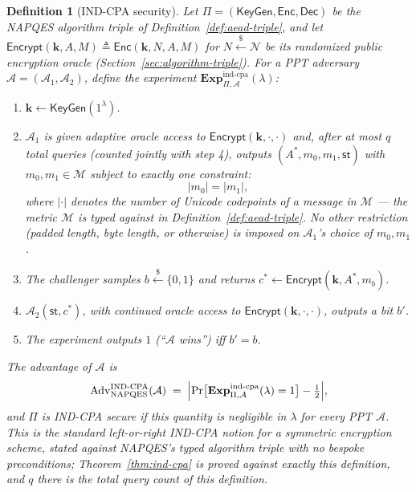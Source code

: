 \documentclass[11pt,a4paper]{article}
\newtheorem{definition}[theorem]{Definition}
\begin{document}
\begin{definition}[IND-CPA security]\label{def:ind-cpa}
Let $\Pi=(\mathsf{KeyGen},\mathsf{Enc},\mathsf{Dec})$ be the NAPQES
algorithm triple of Definition~\ref{def:aead-triple}, and let
$\mathsf{Encrypt}(\mathbf{k},A,M)\triangleq\mathsf{Enc}(\mathbf{k},N,A,M)$
for $N\xleftarrow{\$}\mathcal{N}$ be its randomized public encryption
oracle (Section~\ref{sec:algorithm-triple}). For a PPT adversary
$\mathcal{A}=(\mathcal{A}_1,\mathcal{A}_2)$, define the experiment
$\mathbf{Exp}^{\mathrm{ind\text{-}cpa}}_{\Pi,\mathcal{A}}(\lambda)$:
\begin{enumerate}
  \item $\mathbf{k}\gets\mathsf{KeyGen}(1^\lambda)$.
  \item $\mathcal{A}_1$ is given adaptive oracle access to
        $\mathsf{Encrypt}(\mathbf{k},\cdot,\cdot)$ and, after at most $q$
        total queries (counted jointly with step 4), outputs
        $(A^*,m_0,m_1,\mathsf{st})$ with $m_0,m_1\in\mathcal{M}$ subject to
        exactly one constraint:
        \[
          |m_0| = |m_1|,
        \]
        where $|\cdot|$ denotes the number of Unicode codepoints of a
        message in $\mathcal{M}$ --- the metric $\mathcal{M}$ is typed
        against in Definition~\ref{def:aead-triple}. No other restriction
        (padded length, byte length, or otherwise) is imposed on
        $\mathcal{A}_1$'s choice of $m_0,m_1$.
  \item The challenger samples $b\xleftarrow{\$}\{0,1\}$ and returns
        $c^*\gets\mathsf{Encrypt}(\mathbf{k},A^*,m_b)$.
  \item $\mathcal{A}_2(\mathsf{st},c^*)$, with continued oracle access to
        $\mathsf{Encrypt}(\mathbf{k},\cdot,\cdot)$, outputs a bit $b'$.
  \item The experiment outputs $1$ (``$\mathcal{A}$ wins'') iff $b'=b$.
\end{enumerate}
The advantage of $\mathcal{A}$ is
\[
  \mathrm{Adv}^{\mathrm{IND\text{-}CPA}}_{\mathrm{NAPQES}}(\mathcal{A})
  \;=\;
  \Bigl|\Pr\bigl[\mathbf{Exp}^{\mathrm{ind\text{-}cpa}}_{\Pi,\mathcal{A}}(\lambda)=1\bigr]-\tfrac12\Bigr|,
\]
and $\Pi$ is IND-CPA secure if this quantity is negligible in $\lambda$ for
every PPT $\mathcal{A}$. This is the standard left-or-right IND-CPA notion
for a symmetric encryption scheme, stated against NAPQES's typed algorithm
triple with no bespoke preconditions; Theorem~\ref{thm:ind-cpa} is proved
against exactly this definition, and $q$ there is the total query count of
this definition.
\end{definition}
\end{document}
